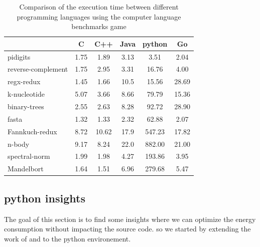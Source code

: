 \begin{table}[hbt]
    \begin{tabular}{l|*{5}c}
                           & C    & C++   & Java & python & Go    \\
        \hline
        pidigits           & 1.75 & 1.89  & 3.13 & 3.51   & 2.04  \\
        reverse-complement & 1.75 & 2.95  & 3.31 & 16.76  & 4.00  \\
        regx-redux         & 1.45 & 1.66  & 10.5 & 15.56  & 28.69 \\
        k-nucleotide       & 5.07 & 3.66  & 8.66 & 79.79  & 15.36 \\
        binary-trees       & 2.55 & 2.63  & 8.28 & 92.72  & 28.90 \\
        fasta              & 1.32 & 1.33  & 2.32 & 62.88  & 2.07  \\
        Fannkuch-redux     & 8.72 & 10.62 & 17.9 & 547.23 & 17.82 \\
        n-body             & 9.17 & 8.24  & 22.0 & 882.00 & 21.00 \\
        spectral-norm      & 1.99 & 1.98  & 4.27 & 193.86 & 3.95  \\
        Mandelbort         & 1.64 & 1.51  & 6.96 & 279.68 & 5.47
    \end{tabular}
    \caption{Comparison of the execution time between different programming languages using the computer language benchmarks game \cite{noauthor_which_nodate}}
    \label{fig:clbg}
\end{table}



\subsection{python insights}
The goal of this section is to find some insights where we can optimize the energy consumption without impacting the source code. so we started by extending the work of \citeauthor{hasan_energy_2016} and \citeauthor{oliveira_recommending_nodate} to the python environement.



